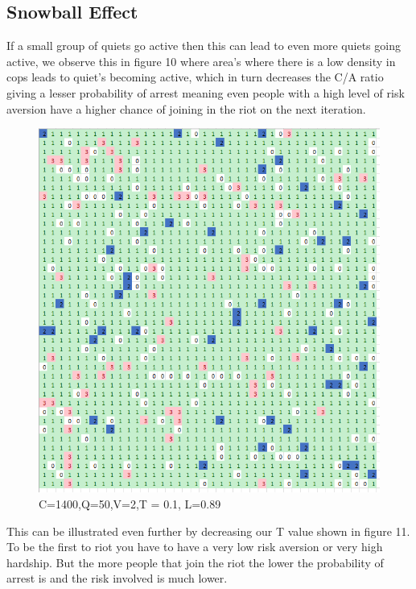 \documentclass[11pt]{article}
\begin{document}
	\subsection{Snowball Effect}
	If a small group of quiets go active then this can lead to even more quiets going active, we observe this in figure 10 where area's where there is a low density in cops leads to quiet's becoming active, which in turn decreases the C/A ratio giving a lesser probability of arrest meaning even people with a high level of risk aversion have a higher chance of joining in the riot on the next iteration.
	\begin{figure}[H]
		\includegraphics[width=\linewidth]{snowball_1_T0.1.png}
		\caption{C=1400,Q=50,V=2,T = 0.1, L=0.89}
		\label{fig:}
	\end{figure}
	This can be illustrated even further by decreasing our T value shown in figure 11.\\
	To be the first to riot you have to have a very low risk aversion or very high hardship. But the more people that join the riot the lower the probability of arrest is and the risk involved is much lower.
\end{document}
